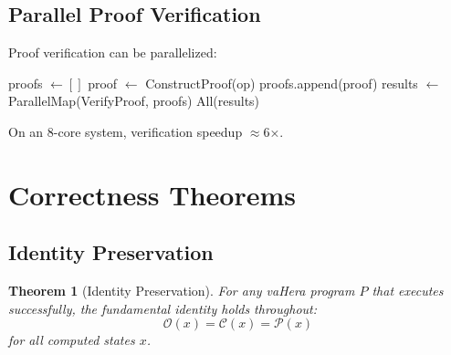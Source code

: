 \documentclass[twocolumn,10pt]{article}
\newtheorem{theorem}{Theorem}[section]
\theoremstyle{definition}
\theoremstyle{remark}
\begin{document}
\subsection{Parallel Proof Verification}

Proof verification can be parallelized:

\begin{algorithm}
\caption{Parallel Proof Verification}
\begin{algorithmic}[1]
    \State proofs $\gets []$
        \State proof $\gets$ ConstructProof(op)
        \State proofs.append(proof)
    \EndFor
    \State results $\gets$ ParallelMap(VerifyProof, proofs)
    \State \Return All(results)
\EndFunction
\end{algorithmic}
\end{algorithm}

On an 8-core system, verification speedup $\approx 6$×.

\section{Correctness Theorems}
\label{sec:correctness}

\subsection{Identity Preservation}

\begin{theorem}[Identity Preservation]
For any vaHera program $P$ that executes successfully, the fundamental identity holds throughout:
\begin{equation}
    \mathcal{O}(x) = \mathcal{C}(x) = \mathcal{P}(x)
\end{equation}
for all computed states $x$.
\end{theorem}
\end{document}
